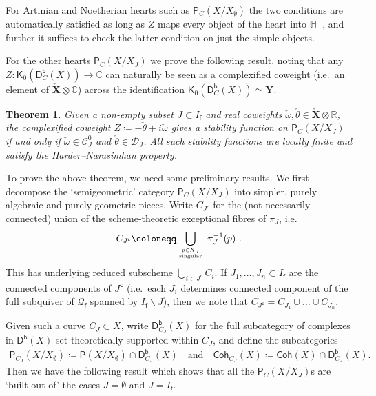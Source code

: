 \documentclass[reqno,a4paper]{amsart}
\newcommand{\calC}{\mathcal{C}}
\newcommand{\calD}{\mathcal{D}}
\newcommand{\C}{\mathbb{C}}
\newcommand{\HH}{\mathbb{H}}
\newcommand{\R}{\mathbb{R}}
\newcommand{\sfK}{\mathsf{K}}
\newcommand{\sff}{\mathsf{f}}
\newcommand{\bfY}{\mathbf{Y}}
\newcommand{\bfX}{\mathbf{X}}
\newcommand{\catP}{\mathsf{P}}
\newcommand{\catPC}{\mathsf{P}_{C}}
\newcommand{\catCoh}{\mathsf{Coh}}
\newcommand{\catDb}{\mathsf{D}^\mathsf{b}}
\newcommand{\catDbC}{\mathsf{D}^\mathsf{b}_C}
\newcommand{\qvfin}{\mathcal{Q}_\sff}
\newcommand{\Lomega}{\check{\omega}}
\newcommand{\Ltheta}{\check{\theta}}
\newcommand{\rootlattice}{\bfY}
\newcommand{\weightlattice}{\bfX}
\newcommand{\coweightlattice}{\check{\weightlattice}}
\newcommand{\rsv}{X}
\newcommand{\ssv}{X_\emptyset}
\newcommand{\psv}{X_J}
\newcommand{\Jcomp}{{J^\mathsf{c}}}
\theoremstyle{basic-theorem}
\newtheorem{theorem}{Theorem}[section]
\numberwithin{equation}{section}
\begin{document}
For Artinian and Noetherian hearts such as $\catPC(\rsv/\ssv)$ the two conditions are automatically satisfied as long as $Z$ maps every object of the heart into $\HH_-$, and further it suffices to check the latter condition on just the simple objects.

For the other hearts $\catPC(\rsv/\psv)$ we prove the following result, noting that any $Z\colon \sfK_0(\catDbC(\rsv))\to \C$ can naturally be seen as a complexified coweight (i.e.\ an element of $\coweightlattice\otimes\C$) across the identification $\sfK_0(\catDbC(\rsv))\simeq \rootlattice$.
\begin{theorem}\label{thm:perverse-stabfuncs}
    Given a non-empty subset $J\subset I_\sff$ and real coweights $\Lomega,\Ltheta\in \coweightlattice\otimes\R$, the complexified coweight $Z\coloneqq -\Ltheta+i\Lomega$ gives a stability function on $\catPC(\rsv/\psv)$
    if and only if $\Lomega\in \calC^0_J$ and $\Ltheta\in \calD_J$. All such stability functions are locally finite and satisfy the Harder--Narasimhan property.
\end{theorem}

To prove the above theorem, we need some preliminary results. We first decompose the `semigeometric' category $\catPC(\rsv/\psv)$ into simpler, purely algebraic and purely geometric pieces. Write $C_\Jcomp$ for the (not necessarily connected) union of the scheme-theoretic exceptional fibres of $\pi_J$, i.e.\
\begin{align}
	C_\Jcomp \coloneqq\bigcup_{\genfrac{}{}{0pt}{}{p\in \psv}{\text{singular}}}\; \pi_J^{-1}(p)\ .
\end{align}
This has underlying reduced subscheme $\bigcup_{i\in \Jcomp}C_i$. If $J_1,\ldots,J_n\subset I_\sff$ are the connected components of $\Jcomp$ (i.e.\ each $J_i$ determines connected component of the full subquiver of $\qvfin$ spanned by $I_\sff\smallsetminus J$), then we note that $C_\Jcomp=C_{J_1}\cup \ldots \cup C_{J_n}$.

Given such a curve $C_J\subset \rsv$, write $\catDb_{C_J}(\rsv)$ for the full subcategory of complexes in $\catDb(\rsv)$ set-theoretically supported within $C_J$, and define the subcategories
\begin{align}
	\catP_{C_J}(\rsv/\ssv)\coloneqq\catP(\rsv/\ssv)\cap  \catDb_{C_J}(\rsv)\quad\text{and}\quad\catCoh_{C_J}(\rsv)\coloneqq\catCoh(\rsv)\cap\catDb_{C_J}(\rsv).
\end{align}
Then we have the following result which shows that all the $\catPC(\rsv/\psv)$s are `built out of' the cases $J=\emptyset$ and $J=I_\sff$.
\end{document}
